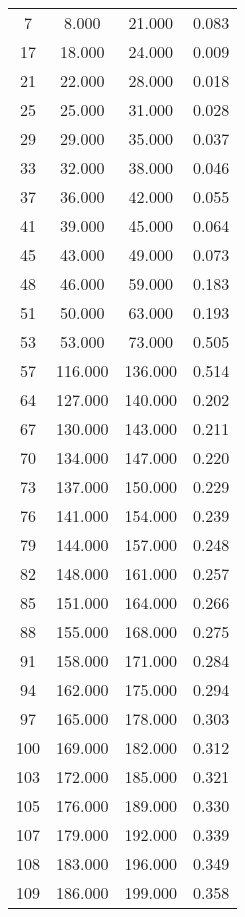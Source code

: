 % 
\begin{tabular}{cccc}
  \hline
  \hline
7 & 8.000 & 21.000 & 0.083 \\ 
  17 & 18.000 & 24.000 & 0.009 \\ 
  21 & 22.000 & 28.000 & 0.018 \\ 
  25 & 25.000 & 31.000 & 0.028 \\ 
  29 & 29.000 & 35.000 & 0.037 \\ 
  33 & 32.000 & 38.000 & 0.046 \\ 
  37 & 36.000 & 42.000 & 0.055 \\ 
  41 & 39.000 & 45.000 & 0.064 \\ 
  45 & 43.000 & 49.000 & 0.073 \\ 
  48 & 46.000 & 59.000 & 0.183 \\ 
  51 & 50.000 & 63.000 & 0.193 \\ 
  53 & 53.000 & 73.000 & 0.505 \\ 
  57 & 116.000 & 136.000 & 0.514 \\ 
  64 & 127.000 & 140.000 & 0.202 \\ 
  67 & 130.000 & 143.000 & 0.211 \\ 
  70 & 134.000 & 147.000 & 0.220 \\ 
  73 & 137.000 & 150.000 & 0.229 \\ 
  76 & 141.000 & 154.000 & 0.239 \\ 
  79 & 144.000 & 157.000 & 0.248 \\ 
  82 & 148.000 & 161.000 & 0.257 \\ 
  85 & 151.000 & 164.000 & 0.266 \\ 
  88 & 155.000 & 168.000 & 0.275 \\ 
  91 & 158.000 & 171.000 & 0.284 \\ 
  94 & 162.000 & 175.000 & 0.294 \\ 
  97 & 165.000 & 178.000 & 0.303 \\ 
  100 & 169.000 & 182.000 & 0.312 \\ 
  103 & 172.000 & 185.000 & 0.321 \\ 
  105 & 176.000 & 189.000 & 0.330 \\ 
  107 & 179.000 & 192.000 & 0.339 \\ 
  108 & 183.000 & 196.000 & 0.349 \\ 
  109 & 186.000 & 199.000 & 0.358 \\ 
   \hline
\end{tabular}
